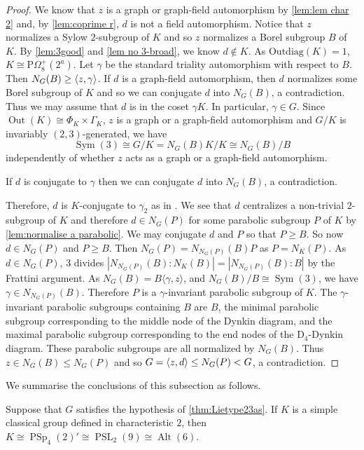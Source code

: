 \documentclass[12pt,a4paper]{amsart}
\DeclareMathOperator{\Out}{Out}
\DeclareMathOperator{\PSL}{PSL}
\DeclareMathOperator{\PSp}{PSp}
\DeclareMathOperator{\Alt}{Alt}
\DeclareMathOperator{\Sym}{Sym}
\DeclarePairedDelimiter{\gen}{\langle}{\rangle}
\begin{document}
\begin{proof} We know that $z$ is a graph or graph-field automorphism  by \cref{lem:lem char 2}  and, by \cref{lem:coprime r}, $d$ is not a field automorphism. Notice that $z$ normalizes a Sylow $2$-subgroup of $K$ and so $z$ normalizes a Borel subgroup $B$ of $K$. By \cref{lem:3good} and \cref{lem no 3-broad}, we know $d \not \in K$. As $\mathrm{Outdiag}(K)=1$,  $K \cong \mathrm{P}\Omega_8^+(2^a)$. Let $\gamma$ be the standard triality automorphism with respect to $B$. Then $N_G(B) \ge \gen{z,\gamma}$. If $d$ is a graph-field  automorphism, then $d$ normalizes some Borel subgroup of $K$ and so we can conjugate $d$ into $N_G(B)$, a contradiction. Thus we may assume that $d$ is in the coset  $\gamma K$. In particular, $\gamma\in G$. Since $\Out(K) \cong \Phi_K\times \Gamma_K$, $z$ is a graph or a graph-field automorphism and $G/K$ is invariably $(2,3)$-generated, we have $$\Sym(3)\cong G/K = N_G(B)K/K\cong N_G(B)/B$$ independently of whether $z$ acts as a graph or a graph-field automorphism.

If $d$ is conjugate to $\gamma$  then we can conjugate $d$ into $N_G(B)$, a contradiction.

Therefore,   $d$ is $K$-conjugate to $\gamma_2$
 as in \cite[Table 4.7.3A]{GLS3}. We see that $d$ centralizes a non-trivial $2$-subgroup of $K$ and therefore $d \in N_G(P)$ for some parabolic subgroup $P$ of $K$ by \cref{lem:normalise a parabolic}.  We  may conjugate $d$ and $P$ so that $P \ge  B$. So now $d\in N_G(P)$ and $P\ge B$.  Then $N_G(P)=N_{N_G(P)}(B)P$ as $P=N_K(P)$. As $d \in N_G(P)$, $3$ divides $|N_{N_G(P)}(B):N_K(B)|=|N_{N_G(P)}(B):B|$ by the Frattini argument.
 As $N_G(B)=B\langle \gamma,z\rangle$, and $N_G(B)/B \cong \Sym(3)$, we have $\gamma \in N_{N_G(P)}(B)$. Therefore $P$ is a $\gamma$-invariant parabolic subgroup of $K$. The $\gamma$-invariant parabolic subgroups containing $B$ are $B$, the minimal parabolic subgroup corresponding to the middle node of the Dynkin diagram, and the maximal parabolic subgroup corresponding to the end nodes of the $\mathrm D_4$-Dynkin diagram. These parabolic subgroups are all normalized by $N_G(B)$. Thus $z\in N_G(B) \le N_G(P)$ and so $G=\gen{z,d} \le N_G(P)<G$, a contradiction.
\end{proof}

We summarise the conclusions of this subsection as follows.

\begin{proposition}\label{prop:not classical 2} Suppose that $G$ satisfies the hypothesis of \cref{thm:Lietype23as}. If $K$ is a simple classical group defined in characteristic $2$, then $K \cong \PSp_4(2)'\cong \PSL_2(9)\cong \Alt(6)$.
\end{proposition}
\end{document}
